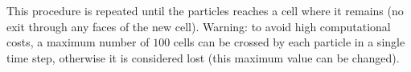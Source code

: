 This procedure is repeated until the particles reaches a cell where it remains (no exit through any faces of the new cell). Warning: to avoid high computational costs, a maximum number of $100$ cells can be crossed by each particle in a single time step, otherwise it is considered lost (this maximum value can be changed).
